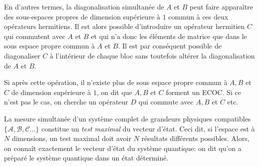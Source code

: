En d'autres termes, la diagonalisation simultanée de $A$ et $B$ peut faire
apparaître des sous-espaces propres de dimension supérieure à $1$ commun à ces
deux opérateurs hermitiens. Il est alors possible d'introduire un opérateur
hermitien $C$ qui commutent avec $A$ et $B$ et qui n'a donc les éléments de
matrice que dans le sous espace propre commun à $A$ et $B$. Il est par
conséquent possible de diagonaliser $C$ à l'intérieur de chaque bloc sans
toutefois altérer la diagonalisation de $A$ et $B$.

Si après cette opération, il n'existe plus de sous espace propre commun à
$A,B$ et $C$ de dimension supérieure à $1$, on dit que $A,B$ et $C$ forment un
ECOC. Si ce n'est pas le cas, on cherche un opérateur $D$ qui commute avec
$A,B$ et $C$ etc.%

La mesure simultanée d'un système complet de grandeurs physiques compatibles
$\{\mathcal{A},\mathcal{B},\mathcal{C}\ldots\}$ constitue un \emph{test maximal
}du vecteur d'état. Ceci dit, si l'espace est à $N$ dimensions, un test maximal
doit avoir $N$ résultats différents possibles. Alors, on connaît exactement le
vecteur d'état du système quantique: on dit qu'on a préparé le système quantique
dans un état déterminé.

